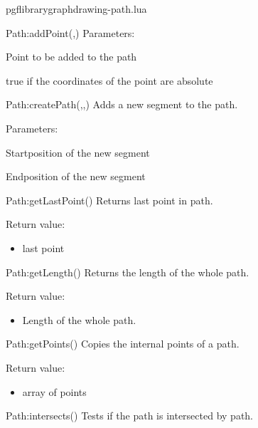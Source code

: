 \begin{filedescription}{pgflibrarygraphdrawing-path.lua}
\begin{luacommand}{{Path:addPoint}(,)}
Parameters:
\begin{parameterdescription}
	\item[\meta{point}] Point to be added to the path\item[\meta{keepAbsPosition}] true if the coordinates of the point are absolute
\end{parameterdescription}



\end{luacommand}\begin{luacommand}{{Path:createPath}(,,)}
Adds a new segment to the path.

Parameters:
\begin{parameterdescription}
	\item[\meta{posStart}] Startposition of the new segment\item[\meta{posEnd}] Endposition of the new segment
\end{parameterdescription}



\end{luacommand}\begin{luacommand}{{Path:getLastPoint}()}
Returns last point in path.


Return value:
\begin{itemize} \item[] last point \end{itemize}


\end{luacommand}\begin{luacommand}{{Path:getLength}()}
Returns the length of the whole path.


Return value:
\begin{itemize} \item[] Length of the whole path. \end{itemize}


\end{luacommand}\begin{luacommand}{{Path:getPoints}()}
Copies the internal points of a path.


Return value:
\begin{itemize} \item[] array of points \end{itemize}


\end{luacommand}\begin{luacommand}{{Path:intersects}()}
Tests if the path is intersected by path.


\end{luacommand}
\end{filedescription}
